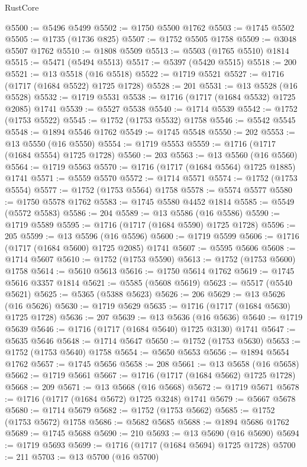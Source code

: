 \begin{lexlean}{RustCore}
\begin{coremodule}
@5500 := @5496 @5499
@5502 := @1750 @5500 @1762
@5503 := @1745 @5502
@5505 := @1735 (@1736 @825)
@5507 := @1752 @5505 @1758
@5509 := @3048 @5507 @1762
@5510 := @1808 @5509
@5513 := @5503 (@1765 @5510) @1814
@5515 := @5471 (@5494 @5513)
@5517 := @5397 (@5420 @5515)
@5518 := 200
@5521 := @13 @5518 (@16 @5518)
@5522 := @1719 @5521
@5527 := @1716 (@1717 (@1684 @5522) @1725 @1728)
@5528 := 201
@5531 := @13 @5528 (@16 @5528)
@5532 := @1719 @5531
@5538 := @1716 (@1717 (@1684 @5532) @1725 @2085) @1741
@5539 := @5527 @5538
@5540 := @1714 @5539
@5542 := @1752 (@1753 @5522)
@5545 := @1752 (@1753 @5532) @1758
@5546 := @5542 @5545
@5548 := @1894 @5546 @1762
@5549 := @1745 @5548
@5550 := 202
@5553 := @13 @5550 (@16 @5550)
@5554 := @1719 @5553
@5559 := @1716 (@1717 (@1684 @5554) @1725 @1728)
@5560 := 203
@5563 := @13 @5560 (@16 @5560)
@5564 := @1719 @5563
@5570 := @1716 (@1717 (@1684 @5564) @1725 @1885) @1741
@5571 := @5559 @5570
@5572 := @1714 @5571
@5574 := @1752 (@1753 @5554)
@5577 := @1752 (@1753 @5564) @1758
@5578 := @5574 @5577
@5580 := @1750 @5578 @1762
@5583 := @1745 @5580 @4452 @1814
@5585 := @5549 (@5572 @5583)
@5586 := 204
@5589 := @13 @5586 (@16 @5586)
@5590 := @1719 @5589
@5595 := @1716 (@1717 (@1684 @5590) @1725 @1728)
@5596 := 205
@5599 := @13 @5596 (@16 @5596)
@5600 := @1719 @5599
@5606 := @1716 (@1717 (@1684 @5600) @1725 @2085) @1741
@5607 := @5595 @5606
@5608 := @1714 @5607
@5610 := @1752 (@1753 @5590)
@5613 := @1752 (@1753 @5600) @1758
@5614 := @5610 @5613
@5616 := @1750 @5614 @1762
@5619 := @1745 @5616 @3357 @1814
@5621 := @5585 (@5608 @5619)
@5623 := @5517 (@5540 @5621)
@5625 := @5365 (@5388 @5623)
@5626 := 206
@5629 := @13 @5626 (@16 @5626)
@5630 := @1719 @5629
@5635 := @1716 (@1717 (@1684 @5630) @1725 @1728)
@5636 := 207
@5639 := @13 @5636 (@16 @5636)
@5640 := @1719 @5639
@5646 := @1716 (@1717 (@1684 @5640) @1725 @3130) @1741
@5647 := @5635 @5646
@5648 := @1714 @5647
@5650 := @1752 (@1753 @5630)
@5653 := @1752 (@1753 @5640) @1758
@5654 := @5650 @5653
@5656 := @1894 @5654 @1762
@5657 := @1745 @5656
@5658 := 208
@5661 := @13 @5658 (@16 @5658)
@5662 := @1719 @5661
@5667 := @1716 (@1717 (@1684 @5662) @1725 @1728)
@5668 := 209
@5671 := @13 @5668 (@16 @5668)
@5672 := @1719 @5671
@5678 := @1716 (@1717 (@1684 @5672) @1725 @3248) @1741
@5679 := @5667 @5678
@5680 := @1714 @5679
@5682 := @1752 (@1753 @5662)
@5685 := @1752 (@1753 @5672) @1758
@5686 := @5682 @5685
@5688 := @1894 @5686 @1762
@5689 := @1745 @5688
@5690 := 210
@5693 := @13 @5690 (@16 @5690)
@5694 := @1719 @5693
@5699 := @1716 (@1717 (@1684 @5694) @1725 @1728)
@5700 := 211
@5703 := @13 @5700 (@16 @5700)

\end{coremodule}
\end{lexlean}
